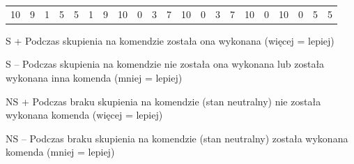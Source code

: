 \documentclass[skorowidz,skroty]{dyplomWEZUT}
\begin{document}
{\begin{landscape}
{\begin{threeparttable}
\begin{tabular}{r|c|c|c|c|c|c|c|c|c|c|c|c|c|c|c|c|c|c|c|c}
                    10 & 9 & 1 & 5 & 5 & 1 & 9 & 10 & 0 & 3 & 7 & 10 & 0 & 3 & 7 & 10 & 0 & 10 & 0 & 5 & 5 \\
                    \end{tabular}
                \begin{tablenotes}
                    \item [S +] Podczas skupienia na komendzie została ona wykonana (więcej = lepiej)
                    \item [S --] Podczas skupienia na komendzie nie została ona wykonana lub została wykonana inna komenda (mniej = lepiej)
                    \item [NS +] Podczas braku skupienia na komendzie (stan neutralny) nie została wykonana komenda (więcej = lepiej)
                    \item [NS --] Podczas braku skupienia na komendzie (stan neutralny) została wykonana komenda (mniej = lepiej)
                \end{tablenotes}
            \end{threeparttable}
        }
    \end{landscape}

}
\end{document}
